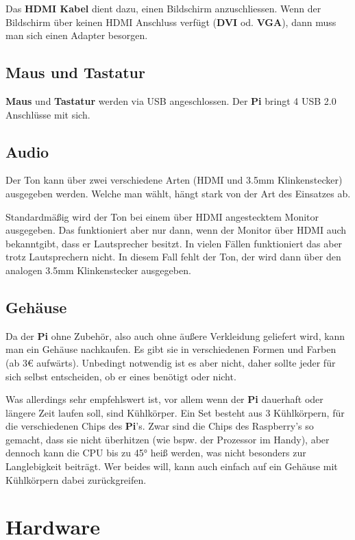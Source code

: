 \documentclass[12pt,a4paper]{article}
\begin{document}
Das \textbf{HDMI Kabel} dient dazu, einen Bildschirm anzuschliessen. Wenn der Bildschirm über keinen HDMI Anschluss verfügt (\textbf{DVI} od. \textbf{VGA}), dann muss man sich einen Adapter besorgen.

\subsection{Maus und Tastatur}

\textbf{Maus} und \textbf{Tastatur} werden via USB angeschlossen. Der \textbf{Pi} bringt 4 USB 2.0 Anschlüsse mit sich.

\subsection{Audio}

Der Ton kann über zwei verschiedene Arten (HDMI und 3.5mm Klinkenstecker) ausgegeben werden. Welche man wählt, hängt stark von der Art des Einsatzes ab.

Standardmäßig wird der Ton bei einem über HDMI angestecktem Monitor ausgegeben. Das funktioniert aber nur dann, wenn der Monitor über HDMI auch bekanntgibt, dass er Lautsprecher besitzt. In vielen Fällen funktioniert das aber trotz Lautsprechern nicht. In diesem Fall fehlt der Ton, der wird dann über den analogen 3.5mm Klinkenstecker ausgegeben.

\subsection{Gehäuse}

Da der \textbf{Pi} ohne Zubehör, also auch ohne äußere Verkleidung geliefert wird, kann man ein Gehäuse nachkaufen. Es gibt sie in verschiedenen Formen und Farben (ab 3€ aufwärts). Unbedingt notwendig ist es aber nicht, daher sollte jeder für sich selbst entscheiden, ob er eines benötigt oder nicht.

Was allerdings sehr empfehlswert ist, vor allem wenn der \textbf{Pi} dauerhaft oder längere Zeit laufen soll, sind Kühlkörper. Ein Set besteht aus 3 Kühlkörpern, für die verschiedenen Chips des \textbf{Pi}'s. Zwar sind die Chips des Raspberry’s so gemacht, dass sie nicht überhitzen (wie bspw. der Prozessor im Handy), aber dennoch kann die CPU bis zu 45° heiß werden, was nicht besonders zur Langlebigkeit beiträgt. Wer beides will, kann auch einfach auf ein Gehäuse mit Kühlkörpern dabei zurückgreifen.

\section{Hardware}
\end{document}
